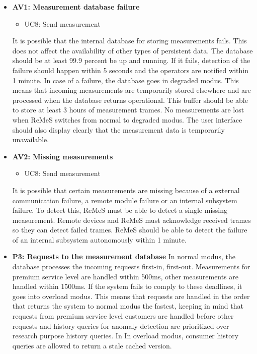 \begin{itemize}
	\item \textbf{AV1: Measurement database failure}
	\begin{itemize}
		\item UC8: Send measurement
	\end{itemize}
	It is possible that the internal database for storing measurements fails. This does not affect the availability of other types of persistent data.
		The database should be at least 99.9 percent be up and running. If it fails, detection of the failure should happen within 5 seconds and the
		operators are notified within 1 minute. In case of a failure, the database goes in degraded modus. This means that incoming measurements are
		temporarily stored elsewhere and are processed when the database returns operational. This buffer should be able to store at least 3 hours 
		of measurement trames. No measurements are lost when ReMeS switches from normal to degraded modus. The user interface should also display
		clearly that the measurement data is temporarily unavailable.
	
	\item \textbf{AV2: Missing measurements}
	\begin{itemize}
		\item UC8: Send measurement
	\end{itemize}
	It is possible that certain measurements are missing because of a external communication failure, a remote module failure or an internal subsystem
		failure. To detect this, ReMeS must be able to detect a single missing measurement. Remote devices and ReMeS must acknowledge received trames so
		they can detect failed trames. ReMeS should be able to detect the failure of an internal subsystem autonomously within 1 minute. 
	
	\item \textbf{P3: Requests to the measurement database}
	In normal modus, the database processes the incoming requests first-in, first-out. Measurements for premium service level are handled within 500ms,
		other measurements are handled within 1500ms. If the system fails to comply to these deadlines, it goes into overload modus. This means that
		requests are handled in the order that returns the system to normal modus the fastest, keeping in mind that requests from premium service level
		customers are handled before other requests and history queries for anomaly detection are prioritized over research purpose history queries. In
		In overload modus, consumer history queries are allowed to return a stale cached version.
	

\end{itemize}
